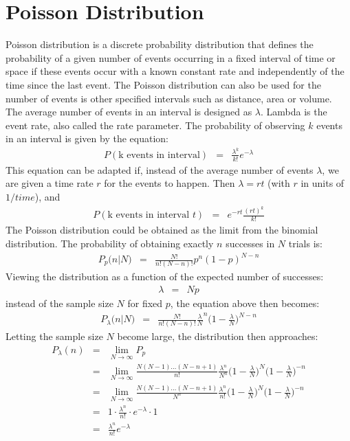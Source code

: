 \chapter{Poisson Distribution}
Poisson distribution is a discrete probability distribution that defines the probability of a given number of events occurring in a fixed interval of time or space if these events occur with a known constant rate and independently of the time since the last event. The Poisson distribution can also be used for the number of events is other specified intervals such as distance, area or volume.\\
The average number of events in an interval is designed as $\lambda$. Lambda is the event rate, also called the rate parameter. The probability of observing $k$ events in an interval is given by the equation:
\begin{eqnarray}
	P(\text{k events in interval}) &=& \frac{\lambda^{k}}{k!}e^{-\lambda}
\end{eqnarray}
This equation can be adapted if, instead of the average number of events $\lambda$, we are given a time rate $r$ for the events to happen. Then $\lambda = rt$ (with $r$ in units of $1 / time$), and
\begin{eqnarray}
	P(\text{k events in interval } t) &=& e^{-rt}\frac{(rt)^{k}}{k!}
\end{eqnarray}
The Poisson distribution could be obtained as the limit from the binomial distribution. The probability of obtaining exactly $n$ successes in $N$ trials is:
\begin{eqnarray}
	P_{p}\big(n\bigr\rvert N\big) &=& \frac{N!}{n! (N - n)!}p^{n}(1 - p)^{N - n}
\end{eqnarray}
Viewing the distribution as a function of the expected number of successes:
\begin{eqnarray}
	\lambda &=& Np
\end{eqnarray}
instead of the sample size $N$ for fixed $p$, the equation above then becomes:
\begin{eqnarray}
	P_{\lambda}\big(n\bigr\rvert N\big) &=& \frac{N!}{n! (N - n)!}\frac{\lambda}{N}^{n}\Big(1 - \frac{\lambda}{N}\Big)^{N - n}
\end{eqnarray}
Letting the sample size $N$ become large, the distribution then approaches:
\begin{eqnarray}
	\nonumber
	P_{\lambda}(n) &=& \lim_{N \rightarrow\infty}P_{p}\\
	\nonumber
	&=& \lim_{N \rightarrow \infty}\frac{N(N - 1)...(N - n + 1)}{n!}\frac{\lambda^{n}}{N^{n}}\bigg(1 - \frac{\lambda}{N}\bigg)^{N}\bigg(1 - \frac{\lambda}{N}\bigg)^{-n}\\
	\nonumber
	&=& \lim_{N \rightarrow \infty}\frac{N(N - 1)...(N - n + 1)}{N^{n}}\frac{\lambda^{n}}{n!}\bigg(1 - \frac{\lambda}{N}\bigg)^{N}\bigg(1 - \frac{\lambda}{N}\bigg)^{-n}\\
	\nonumber
	&=& 1\cdot \frac{\lambda^{n}}{n!} \cdot e^{-\lambda} \cdot 1\\
	&=& \frac{\lambda^{n}}{n!}e^{-\lambda}	
\end{eqnarray}
